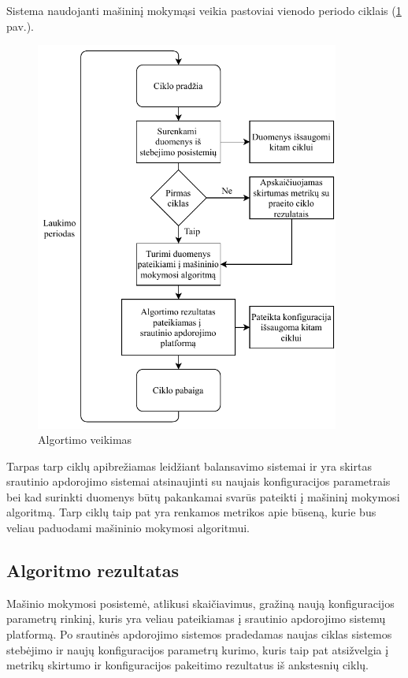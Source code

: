 \documentclass{VUMIFPSbakalaurinis}
\begin{document}
Sistema naudojanti mašininį mokymąsi veikia pastoviai vienodo periodo ciklais (\ref{veikimas} pav.). 
\begin{figure}[H]
    \centering
    \includegraphics[width=10cm]{img/AlgoritmoVeikimas.pdf}
    \caption{Algortimo veikimas}
    \label{veikimas}
\end{figure} 
Tarpas tarp ciklų apibrežiamas leidžiant balansavimo sistemai ir yra skirtas srautinio apdorojimo sistemai atsinaujinti su naujais konfiguracijos parametrais bei kad surinkti duomenys būtų pakankamai svarūs pateikti į mašininį mokymosi algoritmą.
Tarp ciklų taip pat yra renkamos metrikos apie būseną, kurie bus veliau paduodami mašininio mokymosi algoritmui.

\subsection{Algoritmo rezultatas}
Mašinio mokymosi posistemė, atlikusi skaičiavimus, gražiną naują konfiguracijos parametrų rinkinį, kuris yra veliau pateikiamas į srautinio apdorojimo sistemų platformą. Po srautinės apdorojimo sistemos pradedamas naujas ciklas sistemos stebėjimo ir naujų konfiguracijos parametrų kurimo, kuris taip pat atsižvelgia į metrikų skirtumo ir konfiguracijos pakeitimo rezultatus iš  ankstesnių ciklų.


\printbibliography[heading=bibintoc] 
\end{document}
